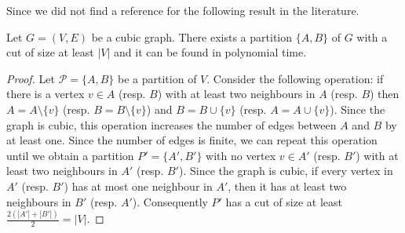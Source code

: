 \documentclass[a4paper,USenglish,cleveref, autoref]{lipics-v2021}
\begin{document}
 

Since we did not find a reference for the following result in the literature. 

\begin{lemma}\label{perhapsknown}
\label{lem:borneUnCut}
Let $G=(V,E)$ be a cubic graph. There exists a partition $\{A,B\}$ of $G$ with a cut of size at least $|V|$ and it can be found in polynomial time.
\end{lemma}

\begin{proof}
Let $\mathcal{P} = \{A,B\}$ be a partition of $V$. Consider the following operation: if there is a vertex $v \in A$ (resp. $B$) with at least two neighbours in $A$ (resp. $B$) then $A = A \setminus \{v\} $ (resp. $B = B \setminus \{v\} $) and $B =  B \cup \{v\} $ (resp. $A = A \cup \{v\} $). Since the graph is cubic, this operation increases the number of edges between $A$ and $B$ by at least one. Since the number of edges is finite, we can repeat this operation until we obtain a partition $P'=\{A',B'\}$ with no vertex $v \in A'$ (resp. $B'$) with at least two neighbours in $A'$ (resp. $B'$). Since the graph is cubic, if every vertex in $A'$ (resp. $B'$) has at most one neighbour in $A'$, then it has at least two neighbours in $B'$ (resp. $A'$). Consequently $P'$ has a cut of size at least $ \frac{2(|A'| + |B'|)}{2} = |V|$.
\end{proof}
\end{document}
